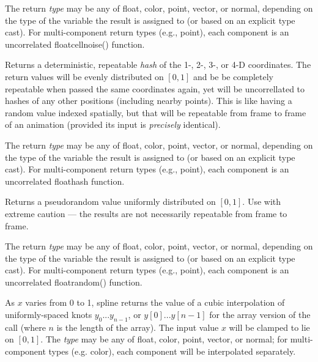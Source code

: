 \documentclass[11pt,letterpaper]{book}
\def\color{{\cf color}\xspace}
\def\float{{\cf float}\xspace}
\def\normal{{\cf normal}\xspace}
\def\point{{\cf point}\xspace}
\def\vector{{\cf vector}\xspace}
\def\cellnoise{{\cf cellnoise()}\xspace}
\begin{document}
The return \emph{type} may be any of \float, \color, \point, \vector, or
\normal, depending on the type of the variable the result is assigned to
(or based on an explicit type cast).  For multi-component return types
(e.g., \point), each component is an uncorrelated \float \cellnoise
function.
\apiend

Returns a deterministic, repeatable \emph{hash} of the 1-, 2-, 3-, or
4-D coordinates.  The return values will be evenly distributed on
$[0,1]$ and be be completely repeatable when passed the same coordinates
again, yet will be uncorrellated to hashes of any other positions
(including nearby points).  This is like having a random value indexed
spatially, but that will be repeatable from frame to frame of an
animation (provided its input is \emph{precisely} identical).

The return \emph{type} may be any of \float, \color, \point, \vector, or
\normal, depending on the type of the variable the result is assigned to
(or based on an explicit type cast).  For multi-component return types
(e.g., \point), each component is an uncorrelated \float {\cf hash}
function.
\apiend

Returns a pseudorandom value uniformly distributed on $[0,1]$.  Use with
extreme caution --- the results are not necessarily repeatable from
frame to frame.

The return \emph{type} may be any of \float, \color, \point, \vector, or
\normal, depending on the type of the variable the result is assigned to
(or based on an explicit type cast).  For multi-component return types
(e.g., \point), each component is an uncorrelated \float {\cf random()}
function.
\apiend


As $x$ varies from 0 to 1, {\cf spline} returns the value of a cubic
interpolation of uniformly-spaced knots $y_0$...$y_{n-1}$, or
$y[0]$...$y[n-1]$ for the array version of the call (where $n$ is the
length of the array).  The input value $x$ will be clamped to lie
on $[0,1]$.  The \emph{type} may be any of \float, \color,
\point, \vector, or \normal; for multi-component types (e.g. \color),
each component will be interpolated separately.
\end{document}

